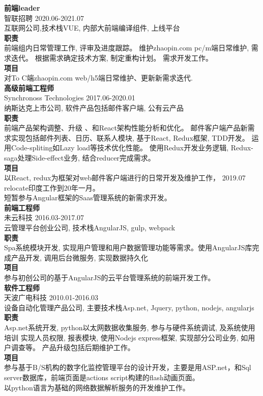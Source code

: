 \documentclass[a4paper,9pt]{extarticle}
\begin{document}
\noindent
\textbf{前端leader} \\
智联招聘 2020.06-2021.07 \\
互联网公司,技术栈VUE, 内部大前端编译组件, 上线平台 \\ 
\textbf{职责} \\
前端组内日常管理工作, 评审及进度跟踪。 维护zhaopin.com pc/m端日常维护, 需求迭代。 根据需求确定技术方案, 制定重构计划。 需求开发工作。 \\ 
\textbf{项目} \\
对To C端zhaopin.com web/h5端日常维护、更新新需求迭代.\\

\noindent
\textbf{高级前端工程师} \\
Synchronoss Technologies 2017.06-2020.01 \\
纳斯达克上市公司, 软件产品包括邮件客户端, 公有云产品 \\
\textbf{职责} \\
前端产品架构调整、升级 、和React架构性能分析和优化。 邮件客户端产品新需求实现包括邮件列表、日历、联系人模块, 基于React, Redux框架, TDD开发。 运用Code-spliting如Lazy load等技术优化性能。 使用Redux开发业务逻辑, Redux-saga处理Side-effect业务, 结合reducer完成需求。\\
\textbf{项目} \\
以React, redux为框架对web邮件客户端进行的日常开发及维护工作， 2019.07 relocate印度工作到20年一月。\\
短暂参与Angular框架的Saas管理系统的新需求开发。\\

\noindent
\textbf{前端工程师} \\
未云科技 2016.03-2017.07  \\
云管理平台创业公司, 技术栈AngularJS, gulp, webpack\\
\textbf{职责} \\
Spa系统模块开发, 实现用户管理和用户数据管理功能等需求。使用AngularJS库完成产品开发, 调用后台微服务, 实现数据持久化 \\
\textbf{项目} \\
参与初创公司的基于AngularJS的云平台管理系统的前端开发工作。\\

\noindent
\textbf{软件工程师} \\
天波广电科技 2010.01-2016.03 \\
设备自动化管理产品公司, 主要技术栈Asp.net, Jquery, python, nodejs, angularjs \\
\textbf{职责} \\
Asp.net系统开发, python以太网数据收集服务, 参与与硬件系统调试, 及系统使用培训 实现人员权限, 报表模块, 使用Nodejs express框架, 实现部分公司业务, 如用户调查等。 产品升级包括后期维护工作。\\
\textbf{项目} \\
参与基于B/S机构的数字化监控管理平台的设计开发，主要是用ASP.net，和Sql server数据库，前端页面是actions script构建的flash动画页面。\\
以python语言为基础的网络数据解析服务的开发维护工作。\\


\end{document}
